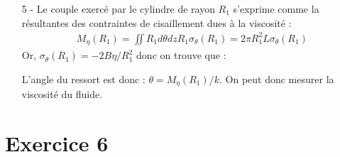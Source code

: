 \documentclass{report}
\begin{document}
\begin{itemize}
	\noindent{}

\item[5 - ] Le couple exercé par le cylindre de rayon $R_1$ s'exprime comme la résultantes des contraintes de cisaillement dues à la viscosité :
\begin{align*}
	M_{\eta}(R_1)=\iint R_1d\theta dz R_1\sigma_\theta(R_1)= 2\pi R_1^2L\sigma_\theta(R_1)
\end{align*}
Or, $\sigma_\theta(R_1) = -2B\eta/R_1^2$ donc on trouve que :

\noindent{}

L'angle du ressort est donc : $\theta = M_{\eta}(R_1)/k$. On peut donc mesurer la viscosité du fluide.

\end{itemize}

\newpage

\section{Exercice 6}
\end{document}

